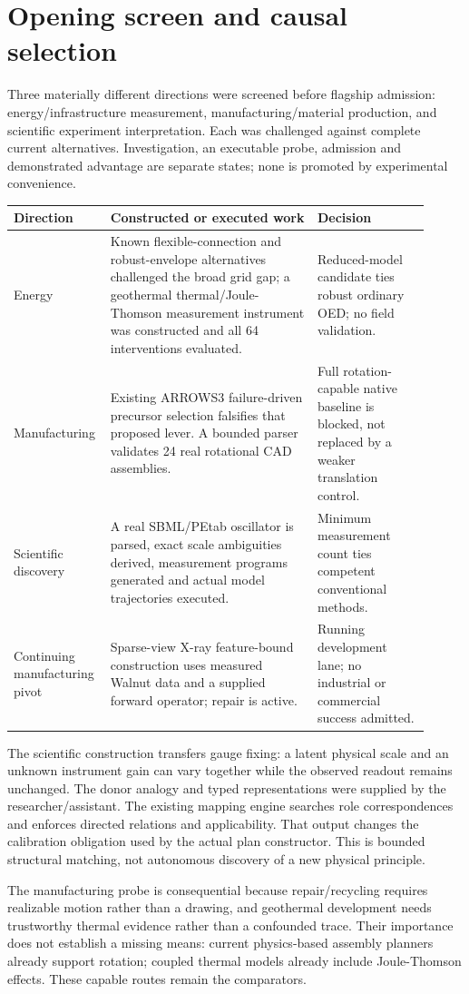 \documentclass[11pt,letterpaper]{article}
\begin{document}
\section{Opening screen and causal selection}
Three materially different directions were screened before flagship admission: energy/infrastructure measurement, manufacturing/material production, and scientific experiment interpretation. Each was challenged against complete current alternatives. Investigation, an executable probe, admission and demonstrated advantage are separate states; none is promoted by experimental convenience.\par
\begingroup\small\begin{longtable}{>{\raggedright\arraybackslash}p{0.17\linewidth}>{\raggedright\arraybackslash}p{0.48\linewidth}>{\raggedright\arraybackslash}p{0.26\linewidth}}\toprule
\textbf{Direction} & \textbf{Constructed or executed work} & \textbf{Decision}\\\midrule\endhead
Energy & Known flexible-connection and robust-envelope alternatives challenged the broad grid gap; a geothermal thermal/Joule-Thomson measurement instrument was constructed and all 64 interventions evaluated. & Reduced-model candidate ties robust ordinary OED; no field validation.\\
Manufacturing & Existing ARROWS3 failure-driven precursor selection falsifies that proposed lever. A bounded parser validates 24 real rotational CAD assemblies. & Full rotation-capable native baseline is blocked, not replaced by a weaker translation control.\\
Scientific discovery & A real SBML/PEtab oscillator is parsed, exact scale ambiguities derived, measurement programs generated and actual model trajectories executed. & Minimum measurement count ties competent conventional methods.\\
Continuing manufacturing pivot & Sparse-view X-ray feature-bound construction uses measured Walnut data and a supplied forward operator; repair is active. & Running development lane; no industrial or commercial success admitted.\\
\bottomrule\end{longtable}\endgroup
The scientific construction transfers gauge fixing: a latent physical scale and an unknown instrument gain can vary together while the observed readout remains unchanged. The donor analogy and typed representations were supplied by the researcher/assistant. The existing mapping engine searches role correspondences and enforces directed relations and applicability. That output changes the calibration obligation used by the actual plan constructor. This is bounded structural matching, not autonomous discovery of a new physical principle.\par
The manufacturing probe is consequential because repair/recycling requires realizable motion rather than a drawing, and geothermal development needs trustworthy thermal evidence rather than a confounded trace. Their importance does not establish a missing means: current physics-based assembly planners already support rotation; coupled thermal models already include Joule-Thomson effects. These capable routes remain the comparators.\par
\end{document}
